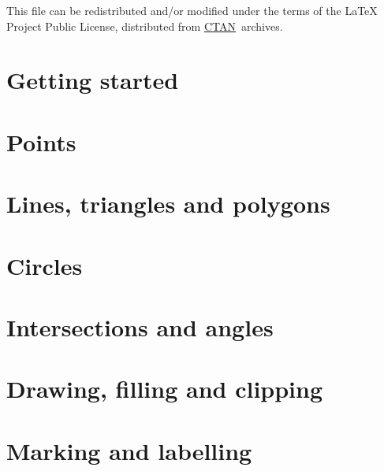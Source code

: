 \documentclass[DIV         = 14,
               fontsize    = 10pt,
               index       = totoc,
               twoside,
               cadre,
               headings    = small,
               ]{tkz-doc}
\begin{document}
This file can be redistributed and/or modified under the terms of the \LaTeX{}
Project Public License, distributed from \href{http://www.ctan.org/}{CTAN}\  archives.

\clearpage
\setcounter{tocdepth}{2}%
\tableofcontents
\clearpage
\newpage

\part{Getting started}





\part{Points}






\part{Lines, triangles and polygons}




\part{Circles}



\part{Intersections and angles}



\part{Drawing, filling and clipping}




\part{Marking and labelling}


\end{document}
